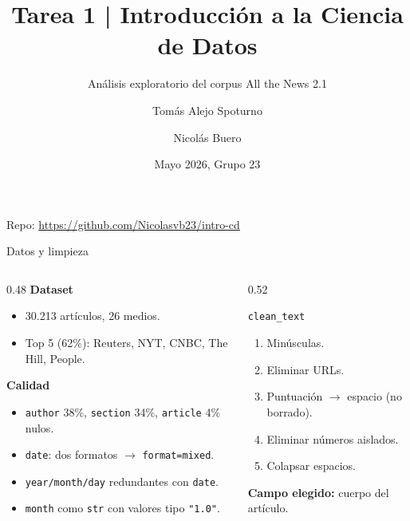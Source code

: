 \documentclass[10pt,aspectratio=169,table]{beamer}
\title[Tarea 1 | Grupo 23]{Tarea 1 | Introducción a la Ciencia de Datos}
\subtitle{Análisis exploratorio del corpus All the News 2.1}
\author[Spoturno \and Buero]{Tomás Alejo Spoturno \and Nicolás Buero}
\institute[FIng, UdelaR]{Facultad de Ingeniería, Universidad de la República}
\date{Mayo 2026, Grupo 23}
\begin{document}
\begin{frame}
  \titlepage
  \begin{center}
    \scriptsize Repo: \url{https://github.com/Nicolasvb23/intro-cd}
  \end{center}
\end{frame}

\begin{frame}{Datos y limpieza}
  \begin{columns}[T]
    \begin{column}{0.48\textwidth}
      \textbf{Dataset}
      \begin{itemize}
        \item 30.213 artículos, 26 medios.
        \item Top 5 (62\%): Reuters, NYT, CNBC, The Hill, People.
      \end{itemize}
      \vspace{0.4em}
      \textbf{Calidad}
      \begin{itemize}
        \item \texttt{author} 38\%, \texttt{section} 34\%, \texttt{article} 4\% nulos.
        \item \texttt{date}: dos formatos $\to$ \texttt{format=mixed}.
        \item \texttt{year/month/day} redundantes con \texttt{date}.
        \item \texttt{month} como \texttt{str} con valores tipo \texttt{"1.0"}.
      \end{itemize}
    \end{column}
    \begin{column}{0.52\textwidth}
      \begin{block}{\texttt{clean\_text}}
        \begin{enumerate}
          \item Minúsculas.
          \item Eliminar URLs.
          \item Puntuación $\to$ espacio (no borrado).
          \item Eliminar números aislados.
          \item Colapsar espacios.
        \end{enumerate}
        \vspace{0.2em}
        \scriptsize\textbf{Campo elegido:} cuerpo del artículo.
      \end{block}
    \end{column}
  \end{columns}
\end{frame}
\end{document}
